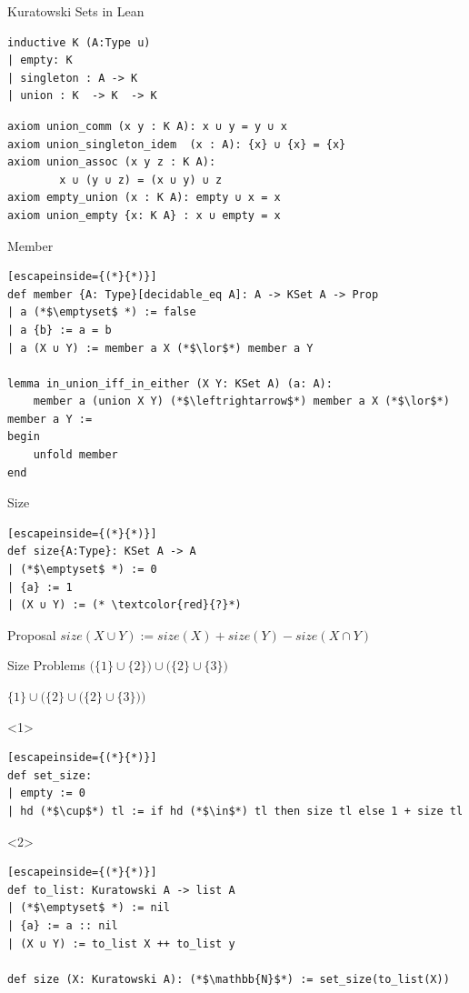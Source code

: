 \documentclass[aspectratio=169]{beamer}
\begin{document}
\begin{frame}[fragile]{Kuratowski Sets in Lean}
    \begin{lstlisting}
inductive K (A:Type u) 
| empty: K 
| singleton : A -> K 
| union : K  -> K  -> K
    \end{lstlisting}
    \pause 
    \begin{lstlisting}
axiom union_comm (x y : K A): x ∪ y = y ∪ x
axiom union_singleton_idem  (x : A): {x} ∪ {x} = {x}
axiom union_assoc (x y z : K A): 
        x ∪ (y ∪ z) = (x ∪ y) ∪ z
axiom empty_union (x : K A): empty ∪ x = x
axiom union_empty {x: K A} : x ∪ empty = x
    \end{lstlisting}
    
\end{frame}
\begin{frame}[fragile]{Member}
    \begin{lstlisting}[escapeinside={(*}{*)}] 
def member {A: Type}[decidable_eq A]: A -> KSet A -> Prop
| a (*$\emptyset$ *) := false
| a {b} := a = b
| a (X ∪ Y) := member a X (*$\lor$*) member a Y

lemma in_union_iff_in_either (X Y: KSet A) (a: A):
    member a (union X Y) (*$\leftrightarrow$*) member a X (*$\lor$*) member a Y :=
begin 
    unfold member
end
    \end{lstlisting}
\end{frame}

\begin{frame}[fragile]{Size}
    \begin{lstlisting}[escapeinside={(*}{*)}]        
def size{A:Type}: KSet A -> A
| (*$\emptyset$ *) := 0
| {a} := 1
| (X ∪ Y) := (* \textcolor{red}{?}*)
    \end{lstlisting}
\pause
    \begin{block}{Proposal}
        $size(X \cup Y) := size(X) + size (Y) - size(X \cap Y)$
    \end{block}
\end{frame}

\begin{frame}[fragile]{Size Problems}
    $\bigl( \{1\} \cup \{2\} \bigr) \cup \bigl( \{2\} \cup \{3\} \bigr) $

    \medskip
    
    $ \{1\} \cup \bigl( \{2\} \cup \bigl( \{2\} \cup \{3\} \bigr) \bigr) $
    \begin{onlyenv}<1>
        \begin{lstlisting}[escapeinside={(*}{*)}]
def set_size:
| empty := 0
| hd (*$\cup$*) tl := if hd (*$\in$*) tl then size tl else 1 + size tl
        \end{lstlisting}
    \end{onlyenv}
    
    \begin{onlyenv}<2>
\begin{lstlisting}[escapeinside={(*}{*)}]
def to_list: Kuratowski A -> list A
| (*$\emptyset$ *) := nil
| {a} := a :: nil
| (X ∪ Y) := to_list X ++ to_list y

def size (X: Kuratowski A): (*$\mathbb{N}$*) := set_size(to_list(X))
    \end{lstlisting}
    \end{onlyenv}
\end{frame}
\end{document}
